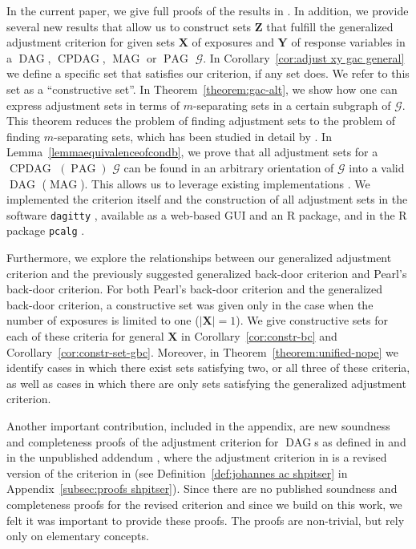\documentclass[11pt,a4paper]{article}
\DeclareMathOperator{\CPDAG}{CPDAG}
\DeclareMathOperator{\DAG}{DAG}
\DeclareMathOperator{\MAG}{MAG}
\DeclareMathOperator{\PAG}{PAG}
\newcommand{\g}[1][G]{\mathcal{#1}}
\begin{document}
In the current paper, we give full proofs of the results in \cite{perkovic15_uai}. In addition, we provide several new results that allow us to construct sets $\mathbf{Z}$ that fulfill the generalized adjustment criterion for given sets $\mathbf{X}$ of exposures and $\mathbf{Y}$ of response variables in a $\DAG$, $\CPDAG$, $\MAG$ or $\PAG$ $\g$. 
In Corollary~\ref{cor:adjust xy gac general} we define a specific set that satisfies our criterion, if any set does. We refer to this set as a ``constructive set''. In Theorem~\ref{theorem:gac-alt}, we show how one can express adjustment sets in terms of $m$-separating sets in a certain subgraph of $\g$. This theorem reduces the problem of finding adjustment sets to the problem of finding $m$-separating sets, which has been studied in detail by \cite{vanconstructing}. In Lemma~\ref{lemmaequivalenceofcondb}, we prove that all adjustment sets for a $\CPDAG$ $(\PAG)$ $\g$ can be found in an arbitrary orientation of $\g$ into a valid $\DAG$ ($\MAG$). This allows us to leverage existing implementations \citep{vanconstructing}. We implemented the criterion itself and the construction of all adjustment sets in the software {\tt dagitty} \citep{textor2016robust}, available as a web-based GUI and an R package, and in the R package {\tt pcalg} \citep{kalischpcalg}.

Furthermore, we explore the relationships between our generalized adjustment criterion and the previously suggested generalized back-door criterion and Pearl's back-door criterion.
For both Pearl's back-door criterion and the generalized back-door criterion, a constructive set was given only in the case when the number of exposures is limited to one ($|\mathbf{X}|=1$).
We give constructive sets for each of these criteria for general $\mathbf{X}$ in Corollary~\ref{cor:constr-bc} and Corollary~\ref{cor:constr-set-gbc}.
Moreover, in Theorem~\ref{theorem:unified-nope} we identify cases in which there exist sets satisfying two, or all three of these criteria, as well as cases in which there are only sets satisfying the generalized adjustment criterion.

Another important contribution, included in the appendix, are new soundness and completeness proofs of the adjustment criterion for $\DAG$s as defined in \cite{shpitser2012validity} and in the unpublished addendum \cite{shpitser2012avalidity}, where the adjustment criterion in \cite{shpitser2012avalidity} is a revised version of the criterion in \cite{shpitser2012validity} (see Definition~\ref{def:johannes ac shpitser} in Appendix~\ref{subsec:proofs shpitser}). Since there are no published soundness and completeness proofs for the revised criterion and since we build on this work, we felt it was important to provide these proofs. The proofs are non-trivial, but rely only on elementary concepts.
\end{document}

